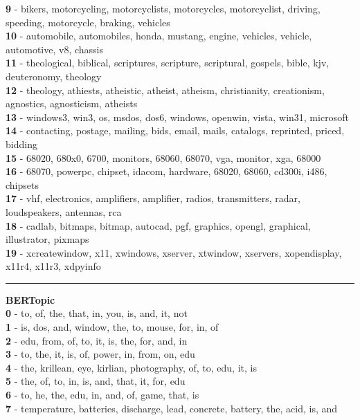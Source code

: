 \textbf{9} - bikers, motorcycling, motorcyclists, motorcycles, motorcyclist, driving, speeding, motorcycle, braking, vehicles\\
\textbf{10} - automobile, automobiles, honda, mustang, engine, vehicles, vehicle, automotive, v8, chassis\\
\textbf{11} - theological, biblical, scriptures, scripture, scriptural, gospels, bible, kjv, deuteronomy, theology\\
\textbf{12} - theology, athiests, atheistic, atheist, atheism, christianity, creationism, agnostics, agnosticism, atheists\\
\textbf{13} - windows3, win3, os, msdos, dos6, windows, openwin, vista, win31, microsoft\\
\textbf{14} - contacting, postage, mailing, bids, email, mails, catalogs, reprinted, priced, bidding\\
\textbf{15} - 68020, 680x0, 6700, monitors, 68060, 68070, vga, monitor, xga, 68000\\
\textbf{16} - 68070, powerpc, chipset, idacom, hardware, 68020, 68060, cd300i, i486, chipsets\\
\textbf{17} - vhf, electronics, amplifiers, amplifier, radios, transmitters, radar, loudspeakers, antennas, rca\\
\textbf{18} - cadlab, bitmaps, bitmap, autocad, pgf, graphics, opengl, graphical, illustrator, pixmaps\\
\textbf{19} - xcreatewindow, x11, xwindows, xserver, xtwindow, xservers, xopendisplay, x11r4, x11r3, xdpyinfo\\
\hrule\vspace{2mm}
\noindent
\textbf{BERTopic}\vspace{2mm}\\
\vspace{2mm}
\noindent
\textbf{0} - to, of, the, that, in, you, is, and, it, not\\
\textbf{1} - is, dos, and, window, the, to, mouse, for, in, of\\
\textbf{2} - edu, from, of, to, it, is, the, for, and, in\\
\textbf{3} - to, the, it, is, of, power, in, from, on, edu\\
\textbf{4} - the, krillean, eye, kirlian, photography, of, to, edu, it, is\\
\textbf{5} - the, of, to, in, is, and, that, it, for, edu\\
\textbf{6} - to, he, the, edu, in, and, of, game, that, is\\
\textbf{7} - temperature, batteries, discharge, lead, concrete, battery, the, acid, is, and\\
